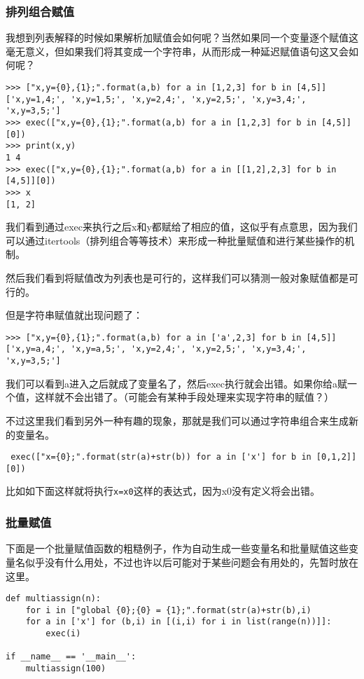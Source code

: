\documentclass[12pt,oneside]{book}
\begin{document}
\begin{common-format}
\subsubsection{排列组合赋值}
我想到列表解释的时候如果解析加赋值会如何呢？当然如果同一个变量逐个赋值这毫无意义，但如果我们将其变成一个字符串，从而形成一种延迟赋值语句这又会如何呢？
\begin{Verbatim}
>>> ["x,y={0},{1};".format(a,b) for a in [1,2,3] for b in [4,5]]
['x,y=1,4;', 'x,y=1,5;', 'x,y=2,4;', 'x,y=2,5;', 'x,y=3,4;', 'x,y=3,5;']
>>> exec(["x,y={0},{1};".format(a,b) for a in [1,2,3] for b in [4,5]][0])
>>> print(x,y)
1 4
>>> exec(["x,y={0},{1};".format(a,b) for a in [[1,2],2,3] for b in [4,5]][0])
>>> x
[1, 2]
\end{Verbatim}
我们看到通过exec来执行之后x和y都赋给了相应的值，这似乎有点意思，因为我们可以通过itertools（排列组合等等技术）来形成一种批量赋值和进行某些操作的机制。

然后我们看到将赋值改为列表也是可行的，这样我们可以猜测一般对象赋值都是可行的。

但是字符串赋值就出现问题了：
\begin{Verbatim}
>>> ["x,y={0},{1};".format(a,b) for a in ['a',2,3] for b in [4,5]]
['x,y=a,4;', 'x,y=a,5;', 'x,y=2,4;', 'x,y=2,5;', 'x,y=3,4;', 'x,y=3,5;']
\end{Verbatim}
我们可以看到a进入之后就成了变量名了，然后exec执行就会出错。如果你给a赋一个值，这样就不会出错了。（可能会有某种手段处理来实现字符串的赋值？）

不过这里我们看到另外一种有趣的现象，那就是我们可以通过字符串组合来生成新的变量名。
\begin{Verbatim}
 exec(["x={0};".format(str(a)+str(b)) for a in ['x'] for b in [0,1,2]][0])
\end{Verbatim}
比如如下面这样就将执行\verb+x=x0+这样的表达式，因为x0没有定义将会出错。


\subsubsection{批量赋值}
下面是一个批量赋值函数的粗糙例子，作为自动生成一些变量名和批量赋值这些变量名似乎没有什么用处，不过也许以后可能对于某些问题会有用处的，先暂时放在这里。
\begin{Verbatim}
def multiassign(n):
    for i in ["global {0};{0} = {1};".format(str(a)+str(b),i) 
    for a in ['x'] for (b,i) in [(i,i) for i in list(range(n))]]:
        exec(i)

if __name__ == '__main__':
    multiassign(100)
\end{Verbatim}





\end{common-format}
\end{document}
